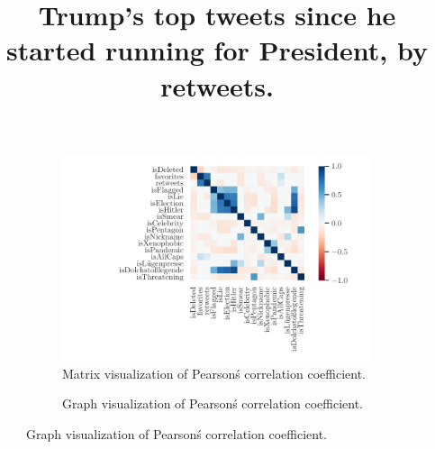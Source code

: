 \documentclass{article}
\begin{document}
    \title{Trump's top tweets since he started running for President, by retweets.}
    \begin{figure}
         \vspace{-3cm}
         \begin{subfigure}{\textwidth}
             \hspace{-3.05cm}
             \includegraphics{corr_heatmap.pdf}
             \caption{Matrix visualization of Pearson\'s correlation coefficient. }
         \end{subfigure}

         \begin{subfigure}{\textwidth}
             \hspace{-1cm}
             
             \caption{Graph visualization of Pearson\'s correlation coefficient.}
         \end{subfigure}
    \end{figure}
\end{document}
